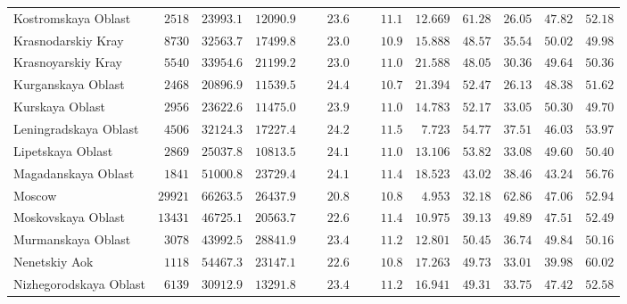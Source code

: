 \documentclass[12pt,a4paper]{article}
\numberwithin{equation}{section}
\begin{document}
{\begin{longtable}{lcccccccccc}
		Kostromskaya Oblast  & $\phantom{0}2518$ & $23993.1$ & $12090.9$ & $\phantom{000}23.6$ & $\phantom{000}11.1$ & $12.669$ & $61.28$ & $26.05$ & $47.82$ & $52.18$ \\
		Krasnodarskiy Kray  & $\phantom{0}8730$ & $32563.7$ & $17499.8$ & $\phantom{000}23.0$ & $\phantom{000}10.9$ & $15.888$ & $48.57$ & $35.54$ & $50.02$ & $49.98$ \\
		Krasnoyarskiy Kray  & $\phantom{0}5540$ & $33954.6$ & $21199.2$ & $\phantom{000}23.0$ & $\phantom{000}11.0$ & $21.588$ & $48.05$ & $30.36$ & $49.64$ & $50.36$ \\
		Kurganskaya Oblast  & $\phantom{0}2468$ & $20896.9$ & $11539.5$ & $\phantom{000}24.4$ & $\phantom{000}10.7$ & $21.394$ & $52.47$ & $26.13$ & $48.38$ & $51.62$ \\
		Kurskaya Oblast  & $\phantom{0}2956$ & $23622.6$ & $11475.0$ & $\phantom{000}23.9$ & $\phantom{000}11.0$ & $14.783$ & $52.17$ & $33.05$ & $50.30$ & $49.70$ \\
		Leningradskaya Oblast  & $\phantom{0}4506$ & $32124.3$ & $17227.4$ & $\phantom{000}24.2$ & $\phantom{000}11.5$ & $\phantom{0}7.723$ & $54.77$ & $37.51$ & $46.03$ & $53.97$ \\
		Lipetskaya Oblast  & $\phantom{0}2869$ & $25037.8$ & $10813.5$ & $\phantom{000}24.1$ & $\phantom{000}11.0$ & $13.106$ & $53.82$ & $33.08$ & $49.60$ & $50.40$ \\
		Magadanskaya Oblast  & $\phantom{0}1841$ & $51000.8$ & $23729.4$ & $\phantom{000}24.1$ & $\phantom{000}11.4$ & $18.523$ & $43.02$ & $38.46$ & $43.24$ & $56.76$ \\
		Moscow  & $29921$ & $66263.5$ & $26437.9$ & $\phantom{000}20.8$ & $\phantom{000}10.8$ & $\phantom{0}4.953$ & $32.18$ & $62.86$ & $47.06$ & $52.94$ \\
		Moskovskaya Oblast  & $13431$ & $46725.1$ & $20563.7$ & $\phantom{000}22.6$ & $\phantom{000}11.4$ & $10.975$ & $39.13$ & $49.89$ & $47.51$ & $52.49$ \\
		Murmanskaya Oblast  & $\phantom{0}3078$ & $43992.5$ & $28841.9$ & $\phantom{000}23.4$ & $\phantom{000}11.2$ & $12.801$ & $50.45$ & $36.74$ & $49.84$ & $50.16$ \\
		Nenetskiy Aok  & $\phantom{0}1118$ & $54467.3$ & $23147.1$ & $\phantom{000}22.6$ & $\phantom{000}10.8$ & $17.263$ & $49.73$ & $33.01$ & $39.98$ & $60.02$ \\
		Nizhegorodskaya Oblast  & $\phantom{0}6139$ & $30912.9$ & $13291.8$ & $\phantom{000}23.4$ & $\phantom{000}11.2$ & $16.941$ & $49.31$ & $33.75$ & $47.42$ & $52.58$ \\

\end{longtable}}
\end{document}
